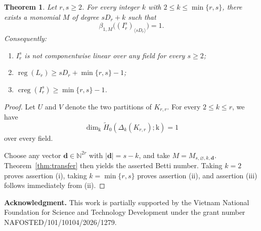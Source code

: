 \documentclass[12pt]{amsart}
\newtheorem{theorem}{Theorem}[section]
\theoremstyle{definition}
\theoremstyle{remark}
\begin{document}
\begin{theorem}\label{thm:Krr}
Let $r, s \ge 2$. For every integer $k$ with $2 \le k \le \min\{r, s\}$, there exists a monomial $M$ of degree $sD_r + k$ such that
\[
\beta_{1, M}\bigl((I_r^s)_{\langle sD_r \rangle}\bigr) = 1.
\]
Consequently:
\begin{enumerate}
\item $I_r^s$ is not componentwise linear over any field for every $s \ge 2$;
\item $\operatorname{reg}(L_r) \ge sD_r + \min\{r, s\} - 1$;
\item $\operatorname{creg}(I_r^s) \ge \min\{r, s\} - 1$.
\end{enumerate}
\end{theorem}

\begin{proof}
Let $U$ and $V$ denote the two partitions of $K_{r,r}$. For every $2 \le k \le r$, we have
\[
\dim_{\mathrm{k}} \widetilde{H}_0(\Delta_k(K_{r,r}); \mathrm{k}) = 1
\]
over every field. 

Choose any vector $\mathbf{d} \in \mathbb{N}^{2r}$ with $|\mathbf{d}| = s - k$, and take $M = M_{s, \varnothing, k, \mathbf{d}}$. Theorem~\ref{thm:transfer} then yields the asserted Betti number. Taking $k = 2$ proves assertion (i), taking $k = \min\{r, s\}$ proves assertion (ii), and assertion (iii) follows immediately from (ii).
\end{proof}


\noindent\textbf{Acknowledgment.} This work is partially supported by the Vietnam National Foundation for Science and Technology Development under the grant number NAFOSTED/101/10104/2026/1279.
\end{document}
